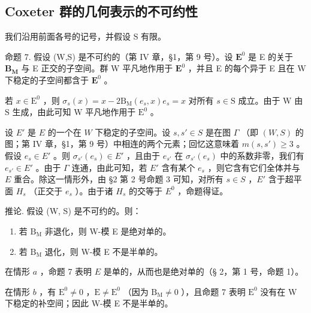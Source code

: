 \subsection{Coxeter 群的几何表示的不可约性}

我们沿用前面各号的记号，并假设 S 有限。

命题 7. 假设 (W,S) 是不可约的（第 IV 章，§1，第 9 号）。设 \(\mathbf{E}^0\) 是 E 的关于 \(\mathbf{B}_{\mathbf{M}}\) 与 E 正交的子空间。群 W 平凡地作用于 \(\mathbf{E}^0\) ，并且 E 的每个异于 E 且在 W 下稳定的子空间都含于 \(\mathbf{E}^0\) 。

若 \(x \in \mathrm{E}^0\) ，则 \(\sigma_s(x) = x - 2\mathrm{B}_{\mathrm{M}}(e_s, x)e_s = x\) 对所有 \(s \in \mathrm{S}\) 成立。由于 \(\mathrm{W}\) 由 \(\mathrm{S}\) 生成，由此可知 \(\mathrm{W}\) 平凡地作用于 \(\mathrm{E}^0\) 。

设 \(E'\) 是 \(E\) 的一个在 \(W\) 下稳定的子空间。设 \(s, s' \in S\) 是在图 \(\Gamma\) （即 \((W, S)\) 的图；第 IV 章，§1，第 9 号）中相连的两个元素；回忆这意味着 \(m(s, s') \geqslant 3\) 。假设 \(e_s \in E'\) 。则 \(\sigma_{s'}(e_s) \in E'\) ，且由于 \(e_{s'}\) 在 \(\sigma_{s'}(e_s)\) 中的系数非零，我们有 \(e_{s'} \in E'\) 。由于 \(\Gamma\) 连通，由此可知，若 \(E'\) 含有某个 \(e_s\) ，则它含有它们全体并与 \(E\) 重合。除这一情形外，由 §2 第 2 号命题 3 可知，对所有 \(s \in S\) ，\(E'\) 含于超平面 \(H_s\) （正交于 \(e_s\) ）。由于诸 \(H_s\) 的交等于 \(E^0\) ，命题得证。

推论. 假设 (W, S) 是不可约的。则：

\begin{enumerate}
\def\labelenumi{\alph{enumi})}
\item
  若 \(\mathrm{B_M}\) 非退化，则 W-模 E 是绝对单的。
\item
  若 \(\mathrm{B_M}\) 退化，则 W-模 E 不是半单的。
\end{enumerate}

在情形 \(a\) ，命题 7 表明 \(E\) 是单的，从而也是绝对单的（§ 2，第 1 号，命题 1）。

在情形 \(b\) ，有 \(\mathrm{E}^0 \neq 0\) ，\(\mathrm{E} \neq \mathrm{E}^0\) （因为 \(\mathrm{B}_{\mathrm{M}} \neq 0\) ），且命题 7 表明 \(\mathrm{E}^0\) 没有在 W 下稳定的补空间；因此 W-模 E 不是半单的。

